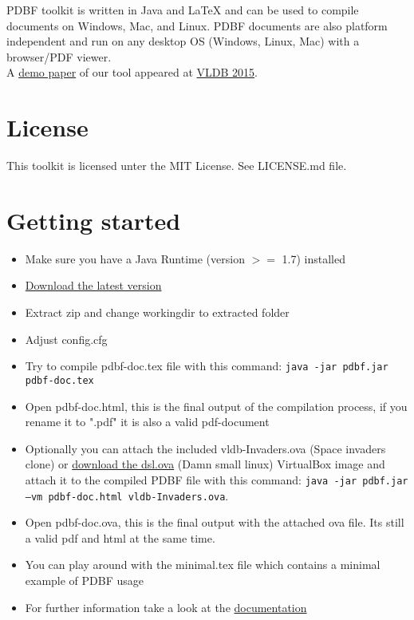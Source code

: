 \documentclass[11pt]{article}
\begin{document}
\noindent PDBF toolkit is written in Java and LaTeX and can be used to compile documents on Windows, Mac, and Linux. PDBF documents are also platform independent and run on any desktop OS (Windows, Linux, Mac) with a browser/PDF viewer.\\

\noindent A \href{https://infosys.uni-saarland.de/publications/p1972-dittrich.html}{demo paper} of our tool appeared at \href{http://www.vldb.org/2015/}{VLDB 2015}. 

\section{License}
\noindent This toolkit is licensed unter the MIT License. See LICENSE.md file.\\

\newpage

\section{Getting started}
\begin{itemize}
\item Make sure you have a Java Runtime (version $>=$ 1.7) installed
\item \href{https://github.com/uds-datalab/PDBF/archive/gh-pages.zip}{Download the latest version}
\item Extract zip and change workingdir to extracted folder
\item Adjust config.cfg
\item Try to compile pdbf-doc.tex file with this command: \texttt{java -jar pdbf.jar pdbf-doc.tex}
\item Open pdbf-doc.html, this is the final output of the compilation process, if you rename it to ".pdf" it is also a valid pdf-document
\item Optionally you can attach the included vldb-Invaders.ova (Space invaders clone) or \href{https://github.com/uds-datalab/PDBF/releases/download/1.0.1/dsl.ova}{download the dsl.ova} (Damn small linux) VirtualBox image and attach it to the compiled PDBF file with this command: \texttt{java -jar pdbf.jar --vm pdbf-doc.html vldb-Invaders.ova}.
\item Open pdbf-doc.ova, this is the final output with the attached ova file. Its still a valid pdf and html at the same time.
\item You can play around with the minimal.tex file which contains a minimal example of PDBF usage
\item For further information take a look at the \href{http://uds-datalab.github.io/PDBF/}{documentation}
\end{itemize}
\end{document}
